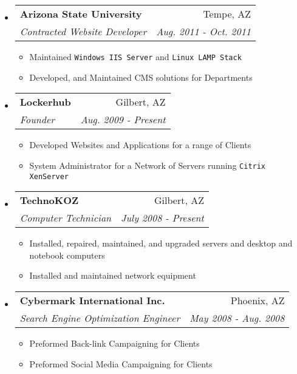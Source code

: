 \documentclass[letterpaper,11pt]{article}
\makeatletter
\newcommand{\resitem}[1]{\item #1 \vspace{-2pt}}
\newcommand{\ressubheading}[4]{

\begin{tabular*}{6.5in}{l@{\cftdotfill{\cftsecdotsep}\extracolsep{\fill}}r}

		\textbf{#1} & #2 \\

		\textit{#3} & \textit{#4} \\

\end{tabular*}\vspace{-6pt}}
\makeatother
\begin{document}
\begin{itemize}

\item

	\ressubheading{Arizona State University}{Tempe, AZ}{Contracted Website Developer}{Aug. 2011 - Oct. 2011}

	\begin{itemize}

		\resitem{Maintained \texttt{Windows IIS Server} and \texttt{Linux LAMP Stack}}

    		\resitem{Developed, and Maintained CMS solutions for Departments}

	\end{itemize}

\item

	\ressubheading{Lockerhub}{Gilbert, AZ}{Founder}{Aug. 2009 - Present}

	\begin{itemize}

		\resitem{Developed Websites and Applications for a range of Clients}

  		 \resitem{System Administrator for a Network of Servers running  \texttt{Citrix XenServer} }

	\end{itemize}

\item 

	\ressubheading{TechnoKOZ}{Gilbert, AZ}{Computer Technician}{July 2008 - Present}

	\begin{itemize}

		\resitem{Installed, repaired, maintained, and upgraded servers and desktop and notebook computers}

 		 \resitem{Installed and maintained network equipment}

	\end{itemize}

\item

	\ressubheading{Cybermark International Inc.}{Phoenix, AZ}{Search Engine Optimization Engineer}{May 2008 - Aug. 2008}

	\begin{itemize}

		\resitem{Preformed Back-link Campaigning for Clients}
		\resitem{Preformed Social Media Campaigning for Clients}

	\end{itemize}
	
\end{itemize}
\end{document}
